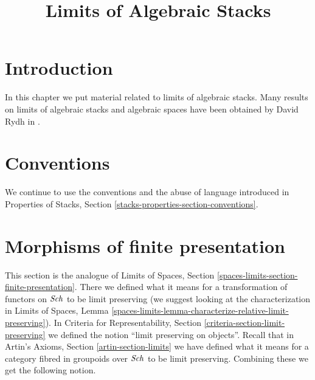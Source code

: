 

%


\title{Limits of Algebraic Stacks}


\maketitle

\label{section-phantom}

\tableofcontents

\section{Introduction}
\label{section-introduction}

\noindent
In this chapter we put material related to limits of algebraic stacks.
Many results on limits of algebraic stacks and algebraic spaces
have been obtained by David Rydh in \cite{rydh_approx}.


\section{Conventions}
\label{section-conventions}

\noindent
We continue to use the conventions and the abuse of language
introduced in
Properties of Stacks, Section \ref{stacks-properties-section-conventions}.







\section{Morphisms of finite presentation}
\label{section-finite-presentation}

\noindent
This section is the analogue of Limits of Spaces, Section
\ref{spaces-limits-section-finite-presentation}.
There we defined what it means for a transformation of functors
on $\mathit{Sch}$ to be limit preserving (we suggest looking at the
characterization in Limits of Spaces, Lemma
\ref{spaces-limits-lemma-characterize-relative-limit-preserving}).
In Criteria for Representability, Section
\ref{criteria-section-limit-preserving}
we defined the notion ``limit preserving on objects''.
Recall that in Artin's Axioms, Section \ref{artin-section-limits}
we have defined what it means for a category fibred in groupoids
over $\mathit{Sch}$ to be limit preserving. Combining these we get
the following notion.

